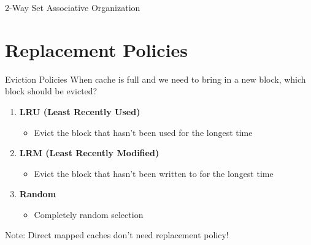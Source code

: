 \documentclass[aspectratio=169,12pt]{beamer}
\begin{document}
\begin{frame}[fragile]{2-Way Set Associative Organization}
\begin{center}
\end{center}
\end{frame}

\section{Replacement Policies}
\begin{frame}{Eviction Policies}
When cache is full and we need to bring in a new block, which block should be evicted?

\begin{enumerate}
    \item \textbf{LRU (Least Recently Used)}
    \begin{itemize}
        \item Evict the block that hasn't been used for the longest time
    \end{itemize}
    
    \item \textbf{LRM (Least Recently Modified)}
    \begin{itemize}
        \item Evict the block that hasn't been written to for the longest time
    \end{itemize}
    
    \item \textbf{Random}
    \begin{itemize}
        \item Completely random selection
    \end{itemize}
\end{enumerate}

Note: Direct mapped caches don't need replacement policy!
\end{frame}
\end{document}
